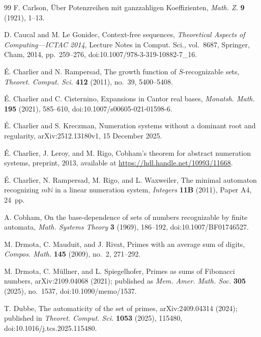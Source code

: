 \begin{thebibliography}{99}
F. Carlson,
{\"U}ber Potenzreihen mit ganzzahligen Koeffizienten,
\textit{Math. Z.} \textbf{9} (1921), 1--13.

D. Caucal and M. Le Gonidec,
Context-free sequences,
\textit{Theoretical Aspects of Computing---ICTAC 2014},
Lecture Notes in Comput. Sci., vol.~8687, Springer, Cham, 2014,
pp.~259--276,
doi:10.1007/978-3-319-10882-7\_16.

\'E. Charlier and N. Rampersad,
The growth function of \(S\)-recognizable sets,
\textit{Theoret. Comput. Sci.} \textbf{412} (2011), no.~39, 5400--5408.

\'E. Charlier and C. Cisternino,
Expansions in Cantor real bases,
\textit{Monatsh. Math.} \textbf{195} (2021), 585--610,
doi:10.1007/s00605-021-01598-6.

\'E. Charlier and S. Kreczman,
Numeration systems without a dominant root and regularity,
arXiv:2512.13180v1, 15 December 2025.

\'E. Charlier, J. Leroy, and M. Rigo,
Cobham's theorem for abstract numeration systems,
preprint, 2013, available at \url{https://hdl.handle.net/10993/11668}.

\'E. Charlier, N. Rampersad, M. Rigo, and L. Waxweiler,
The minimal automaton recognizing \(m\mathbb{N}\) in a linear numeration
system,
\textit{Integers} \textbf{11B} (2011), Paper A4, 24~pp.

A. Cobham,
On the base-dependence of sets of numbers recognizable by finite automata,
\textit{Math. Systems Theory} \textbf{3} (1969), 186--192,
doi:10.1007/BF01746527.

M. Drmota, C. Mauduit, and J. Rivat,
Primes with an average sum of digits,
\textit{Compos. Math.} \textbf{145} (2009), no.~2, 271--292.

M. Drmota, C. M\"ullner, and L. Spiegelhofer,
Primes as sums of Fibonacci numbers,
arXiv:2109.04068 (2021); published as
\textit{Mem. Amer. Math. Soc.} \textbf{305} (2025), no.~1537,
doi:10.1090/memo/1537.

T. Dubbe,
The automaticity of the set of primes,
arXiv:2409.04314 (2024); published in
\textit{Theoret. Comput. Sci.} \textbf{1053} (2025), 115480,
doi:10.1016/j.tcs.2025.115480.


\end{thebibliography}
